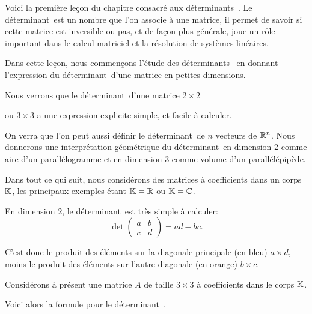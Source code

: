 




\newcommand{\deter}{déter\-mi\-nant\ }
\newcommand{\deters}{déter\-mi\-nants\ }



\debuttexte


\diapo

Voici la  première leçon du chapitre consacré aux \deters.  Le \deter est un nombre
que l'on associe à une matrice, 
il permet de savoir si cette matrice est inversible ou pas, et de façon plus générale, 
joue un rôle important dans le calcul matriciel et la résolution de systèmes linéaires.

\change
Dans cette leçon, nous commençons l'étude des \deters 
en donnant l'expression du \deter d'une matrice en petites dimensions.

\change
Nous verrons que le \deter d'une matrice $2\times2$

\change
ou $3\times3$ a une expression explicite simple, et facile à calculer.

\change  

On verra que l'on peut aussi définir le \deter de $n$ vecteurs de $\mathbb{R}^n$. 
Nous donnerons une interprétation géo\-mé\-trique du \deter en dimension 2 
comme aire d'un paral\-lé\-logramme et en dimension 3 comme volume d'un paral\-lélé\-pipède.


\diapo
Dans tout ce qui suit, nous considérons des matrices à coefficients 
dans un corps $\mathbb{K}$, les principaux exemples étant $\mathbb{K}=\mathbb{R}$ ou $\mathbb{K}=\mathbb{C}$.

\change
En dimension $2$, le \deter est très simple à calculer:
$$\det \begin{pmatrix}a&b\\c&d\end{pmatrix} = ad-bc.$$

\change
C'est donc le produit des éléments sur la diagonale principale (en bleu) $a \times d$, 
moins le produit des éléments sur l'autre diagonale (en orange) $b \times c$.


\diapo
Considérons à présent une matrice $A$ de taille $3\times3$ à coefficients dans le corps $\mathbb{K}$.

\change
Voici alors la formule pour le \deter.

